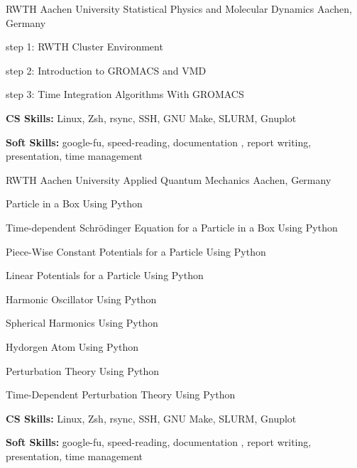 \begin{cventries}
{\begin{cvitems}
      \end{cvitems}
    }
  \cventry
    {RWTH Aachen University} %
    {Statistical Physics and Molecular Dynamics} %
    {Aachen, Germany} %
    {} %
    {
      \begin{cvitems} %
        \item {step 1: RWTH Cluster Environment}
        \item {step 2: Introduction to GROMACS and VMD}
        \item {step 3: Time Integration Algorithms With GROMACS}
        \item {\textbf{CS Skills:} Linux, Zsh, rsync, SSH, GNU Make, SLURM, Gnuplot}
        \item {\textbf{Soft Skills:} google-fu, speed-reading, documentation , report writing, presentation, time management}
      \end{cvitems}
    }
  \cventry
    {RWTH Aachen University} %
    {Applied Quantum Mechanics} %
    {Aachen, Germany} %
    {} %
    {
      \begin{cvitems} %
        \item {Particle in a Box Using Python}
        \item {Time-dependent Schrödinger Equation for a Particle in a Box Using Python}
        \item {Piece-Wise Constant Potentials for a Particle Using Python}
        \item {Linear Potentials for a Particle Using Python}
        \item{Harmonic Oscillator Using Python}
        \item{Spherical Harmonics Using Python}
        \item{Hydorgen Atom Using Python}
        \item{Perturbation Theory Using Python}
        \item{Time-Dependent Perturbation Theory Using Python}
        \item {\textbf{CS Skills:} Linux, Zsh, rsync, SSH, GNU Make, SLURM, Gnuplot}
        \item {\textbf{Soft Skills:} google-fu, speed-reading, documentation , report writing, presentation, time management}
      \end{cvitems}
    }


\end{cventries}
